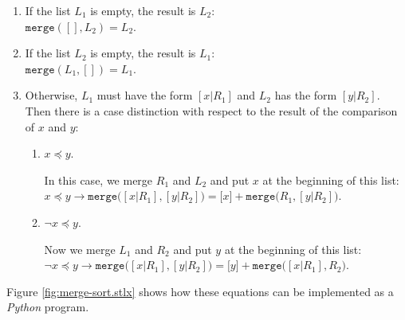 \begin{enumerate}
\item If the list $L_1$ is empty, the result is $L_2$: \\[0.2cm]
      \hspace*{1.3cm} 
      $\mathtt{merge}([], L_2) = L_2$.
\item If the list $L_2$  is empty, the result is $L_1$: \\[0.2cm]
      \hspace*{1.3cm} 
      $\mathtt{merge}(L_1, []) = L_1$.
\item Otherwise, $L_1$ must have the form $[x|R_1]$ and $L_2$ has the form $[y|R_2]$.
      Then there is a case distinction with respect to the result of the comparison of $x$ and $y$:
      \begin{enumerate}
      \item $x \preceq y$.

            In this case, we merge $R_1$ and $L_2$ and put $x$ at the beginning of this list:
            \\[0.2cm]
            \hspace*{1.3cm} 
            $x \preceq y \rightarrow \mathtt{merge}\bigl([x|R_1], [y|R_2]\bigr) = \bigl[x\bigr] + \mathtt{merge}\bigl(R_1,[y|R_2]\bigr)$.
      \item $\neg x \preceq y$.

            Now we merge $L_1$ and $R_2$ and put $y$ at the beginning of this list:
            \\[0.2cm]
            \hspace*{1.3cm} 
            $\neg x \preceq y \rightarrow \mathtt{merge}\bigl([x|R_1], [y|R_2]\bigr) = \bigl[y \bigr] + \mathtt{merge}\bigl([x|R_1],R_2\bigr)$.
      \end{enumerate}
\end{enumerate}

Figure \ref{fig:merge-sort.stlx} shows how these equations can be implemented as a \textsl{Python}
program.  

